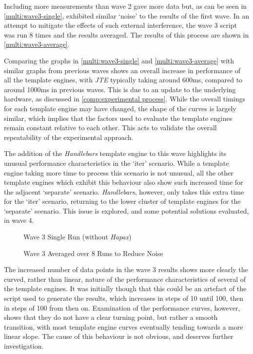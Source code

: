 Including more measurements than wave 2 gave more data but, as can be seen in \autoref{multi:wave3-single}, exhibited similar `noise' to the results of the first wave. In an attempt to mitigate the effects of such external interference, the wave 3 script was run 8 times and the results averaged. The results of this process are shown in \autoref{multi:wave3-average}. 

Comparing the graphs in \autoref{multi:wave3-single} and \autoref{multi:wave3-average} with similar graphs from previous waves shows an overall increase in performance of all the template engines, with \emph{JTE} typically taking around 600ms, compared to around 1000ms in previous waves. This is due to an update to the underlying hardware, as discussed in \autoref{comp:experimental process}. While the overall timings for each template engine may have changed, the shape of the curves is largely similar, which implies that the factors used to evaluate the template engines remain constant relative to each other. This acts to validate the overall repeatability of the experimental approach.

The addition of the \emph{Handlebars} template engine to this wave highlights its unusual performance characteristics in the `iter' scenario. While a template engine taking more time to process this scenario is not unusual, all the other template engines which exhibit this behaviour also show such increased time for the adjacent `separate' scenario. \emph{Handlebars}, however, only takes this extra time for the `iter' scenario, returning to the lower cluster of template engines for the `separate' scenario. This issue is explored, and some potential solutions evaluated, in wave 4.

\begin{figure}[ht!]
\centering

\caption{\label{multi:wave3-single}Wave 3 Single Run (without \emph{Hapax})}
\end{figure}

\begin{figure}[ht!]
\centering

\caption{\label{multi:wave3-average}Wave 3 Averaged over 8 Runs to Reduce Noise}
\end{figure}

The increased number of data points in the wave 3 results shows more clearly the curved, rather than linear, nature of the performance characteristics of several of the template engines. It was initially though that this could be an artefact of the script used to generate the results, which increases in steps of 10 until 100, then in steps of 100 from then on. Examination of the performance curves, however, shows that they do not have a clear turning point, but rather a smooth transition, with most template engine curves eventually tending towards a more linear slope. The cause of this behaviour is not obvious, and deserves further investigation.

